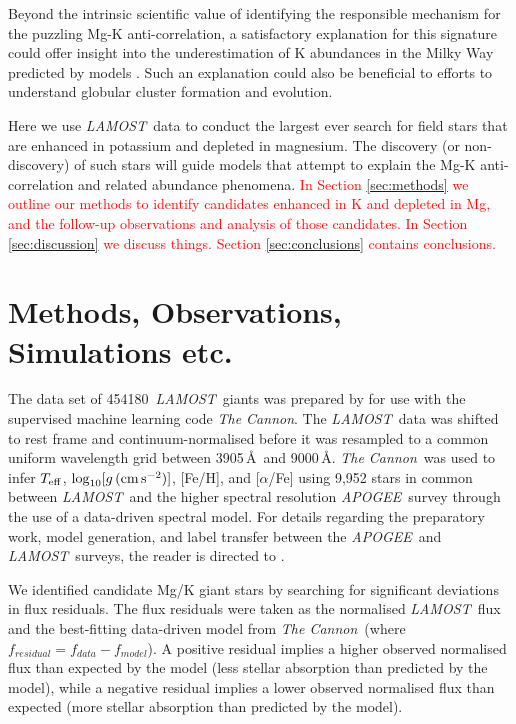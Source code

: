 \documentclass[a4paper,fleqn,usenatbib]{mnras}
\newcommand{\todo}[1]{\textcolor{red}{#1}}
\newcommand{\LamostGiants}{454180}
\newcommand{\project}[1]{\emph{#1}}
\newcommand{\lamost}{\project{LAMOST}}
\newcommand{\apogee}{\project{APOGEE}}
\newcommand{\tc}{\project{The Cannon}}
\newcommand{\teff}{T_{\rm eff}}
\newcommand{\logg}{\log_{10}[g\,({\rm cm\,s}^{-2})]}
\begin{document}
Beyond the intrinsic scientific value of identifying the responsible mechanism for the puzzling Mg-K anti-correlation, a satisfactory explanation for this signature could offer insight into the underestimation of K abundances in the Milky Way predicted by models \citep{kobayashi2011}. Such an explanation could also be beneficial to efforts to understand globular cluster formation and evolution.

Here we use \lamost\ data to conduct the largest ever search for field stars that are enhanced in potassium and depleted in magnesium. The discovery (or non-discovery) of such stars will guide models that attempt to explain the Mg-K anti-correlation and related abundance phenomena. \todo{In Section \ref{sec:methods} we outline our methods to identify candidates enhanced in K and depleted in Mg, and the follow-up observations and analysis of those candidates. In Section \ref{sec:discussion} we discuss things. Section \ref{sec:conclusions} contains conclusions.}




\section{Methods, Observations, Simulations etc.}

The data set of \LamostGiants\ \lamost\ giants was prepared by \citet{ho2017} for use with the supervised machine learning code \tc. The \lamost\ data was shifted to rest frame and continuum-normalised before it was resampled to a common uniform wavelength grid between 3905\,\AA\ and 9000\,\AA. \tc\ was used to infer $\teff$, $\logg$, [Fe/H], and [$\alpha$/Fe] using 9,952 stars in common between \lamost\ and the higher spectral resolution \apogee\ survey through the use of a data-driven spectral model. For details regarding the preparatory work, model generation, and label transfer between the \apogee\ and \lamost\ surveys, the reader is directed to \citet{ho2017}. 

We identified candidate Mg/K giant stars by searching for significant deviations in flux residuals. The flux residuals were taken as the normalised \lamost\ flux and the best-fitting data-driven model from \tc\ (where $f_{residual} = f_{data} - f_{model}$). A positive residual implies a higher observed normalised flux than expected by the model (less stellar absorption than predicted by the model), while a negative residual implies a lower observed normalised flux than expected (more stellar absorption than predicted by the model). 
\end{document}
